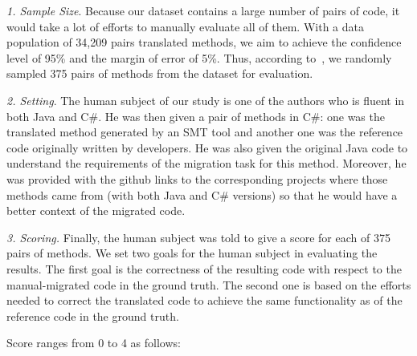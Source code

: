 
\emph{1. Sample Size}. Because our dataset contains a large number of
pairs of code, it would take a lot of efforts to manually evaluate all
of them. With a data population of 34,209 pairs translated methods, we
aim to achieve the confidence level of 95\% and the margin of error of
5\%. Thus, according to~\cite{website}, we randomly sampled 375
pairs of methods from the dataset for evaluation.


\emph{2. Setting}. The human subject of our study is one of the
authors who is fluent in both Java and C\#. He was then given a pair
of methods in C\#: one was the translated method generated by an SMT
tool and another one was the reference code originally written by
developers.
He was also given the original Java code to understand the
requirements of the migration task for this method. Moreover, he was
provided with the github links to the corresponding projects where
those methods came from (with both Java and C\# versions) so that he
would have a better context of the migrated code.

\emph{3. Scoring.} Finally, the human subject was told to give a score
for each of 375 pairs of methods. We set two goals for the human
subject in evaluating the results. The first goal is the correctness of
the resulting code with respect to the manual-migrated code in the
ground truth. The second one is based on the efforts needed to correct
the translated code to achieve the same functionality as of the
reference code in the ground truth.
%

Score ranges from 0 to 4 as follows:

